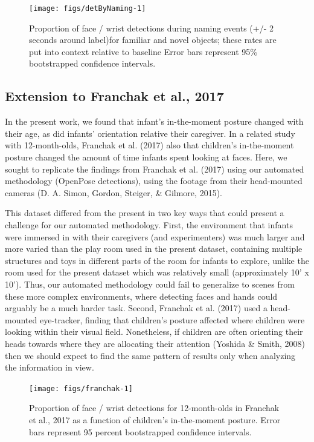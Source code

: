 \documentclass[english,man,floatsintext]{apa6}
\begin{document}
\begin{figure}[!h]

{\centering \texttt{[image: figs/detByNaming-1]} 

}

\caption{Proportion of face / wrist detections during naming events (+/- 2 seconds around label)for familiar and novel objects; these rates are put into context relative to baseline Error bars represent 95\% bootstrapped confidence intervals.}\label{fig:detByNaming}
\end{figure}

\subsection{Extension to Franchak et al.,
2017}\label{extension-to-franchak-et-al.-2017}

In the present work, we found that infant's in-the-moment posture
changed with their age, as did infants' orientation relative their
caregiver. In a related study with 12-month-olds, Franchak et al. (2017)
also that children's in-the-moment posture changed the amount of time
infants spent looking at faces. Here, we sought to replicate the
findings from Franchak et al. (2017) using our automated methodology
(OpenPose detections), using the footage from their head-mounted cameras
(D. A. Simon, Gordon, Steiger, \& Gilmore, 2015).

This dataset differed from the present in two key ways that could
present a challenge for our automated methodology. First, the
environment that infants were immersed in with their caregivers (and
experimenters) was much larger and more varied than the play room used
in the present dataset, containing multiple structures and toys in
different parts of the room for infants to explore, unlike the room used
for the present dataset which was relatively small (approximately 10' x
10'). Thus, our automated methodology could fail to generalize to scenes
from these more complex environments, where detecting faces and hands
could arguably be a much harder task. Second, Franchak et al. (2017)
used a head-mounted eye-tracker, finding that children's posture
affected where children were looking within their visual field.
Nonetheless, if children are often orienting their heads towards where
they are allocating their attention (Yoshida \& Smith, 2008) then we
should expect to find the same pattern of results only when analyzing
the information in view.

\begin{figure}[!h]

{\centering \texttt{[image: figs/franchak-1]} 

}

\caption{Proportion of face / wrist detections for 12-month-olds in Franchak et al., 2017 as a function of children's in-the-moment posture. Error bars represent 95 percent bootstrapped confidence intervals.}\label{fig:franchak}
\end{figure}
\end{document}
